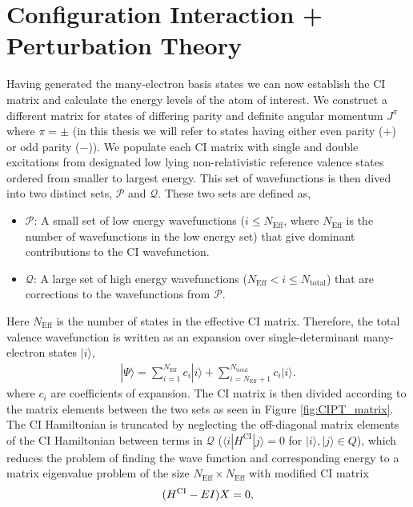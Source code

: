\documentclass[10pt,a4paper, twoside, openright]{report}
\begin{document}
\section{Configuration Interaction + Perturbation Theory}
Having generated the many-electron basis states we can now establish the CI matrix and calculate the energy levels of the atom of interest. We construct a different matrix for states of differing parity and definite angular momentum $J^{\pi}$ where $\pi = \pm$ (in this thesis we will refer to states having either even parity ($+$) or odd parity ($-$)). We populate each CI matrix with single and double excitations from designated low lying non-relativistic reference valence states ordered from smaller to largest energy.  This set of wavefunctions is then dived into two distinct sets, $\mathcal{P}$ and $\mathcal{Q}$. These two sets are defined as,
\begin{itemize}
\item $\mathcal{P}$: A small set of low energy wavefunctions ($i \leq N_{\text{Eff}}$, where $N_{\text{Eff}}$ is the number of wavefunctions in the low energy set) that give dominant contributions to the CI wavefunction.
\item $\mathcal{Q}$: A large set of high energy wavefunctions ($N_{\text{Eff}}<i \leq N_{\text{total}}$) that are corrections to the wavefunctions from $\mathcal{P}$.
\end{itemize}
Here $N_{\text{Eff}}$ is the number of states in the effective CI matrix. Therefore, the total valence wavefunction is written as an expansion over single-determinant many-electron states $|i \rangle $,
\begin{align} 
| \Psi \rangle = \sum_{i=1}^{N_{\text{Eff}}} c_{i}|i\rangle + \sum_{i = N_{\text{Eff}} + 1}^{N_{\text{total}}} c_{i}|i\rangle . \label{eq:psi}
\end{align}
where $c_i$ are coefficients of expansion. The CI matrix is then divided according to the matrix elements between the two sets as seen in Figure \ref{fig:CIPT_matrix}.  The CI Hamiltonian is truncated by neglecting the off-diagonal matrix elements of the CI Hamiltonian between terms in $\mathcal{Q}$ ($\langle i | H^{\text{CI}} | j \rangle = 0 $ for $|i\rangle, |j\rangle \in Q$),  which reduces the problem of finding the wave function and corresponding energy to a matrix eigenvalue problem of the size $N_{\text{Eff}} \times N_{\text{Eff}}$ with modified CI matrix
\begin{equation} \label{eq:CI}
(H^{\rm CI} - EI)X=0,
\end{equation}
\end{document}
